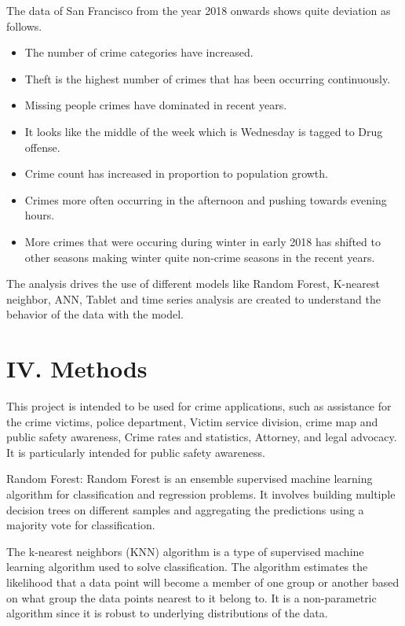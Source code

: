\documentclass[conference,final,]{IEEEtran}
\providecommand{\tightlist}{%
  \setlength{\itemsep}{0pt}\setlength{\parskip}{0pt}}
\begin{document}
The data of San Francisco from the year 2018 onwards shows quite
deviation as follows.

\begin{itemize}
\tightlist
\item
  The number of crime categories have increased.
\item
  Theft is the highest number of crimes that has been occurring
  continuously.
\item
  Missing people crimes have dominated in recent years.
\item
  It looks like the middle of the week which is Wednesday is tagged to
  Drug offense.
\item
  Crime count has increased in proportion to population growth.
\item
  Crimes more often occurring in the afternoon and pushing towards
  evening hours.
\item
  More crimes that were occuring during winter in early 2018 has shifted
  to other seasons making winter quite non-crime seasons in the recent
  years.
\end{itemize}

The analysis drives the use of different models like Random Forest,
K-nearest neighbor, ANN, Tablet and time series analysis are created to
understand the behavior of the data with the model.

\section{IV. Methods}\label{iv.-methods}

This project is intended to be used for crime applications, such as
assistance for the crime victims, police department, Victim service
division, crime map and public safety awareness, Crime rates and
statistics, Attorney, and legal advocacy. It is particularly intended
for public safety awareness.

Random Forest: Random Forest is an ensemble supervised machine learning
algorithm for classification and regression problems. It involves
building multiple decision trees on different samples and aggregating
the predictions using a majority vote for classification.

The k-nearest neighbors (KNN) algorithm is a type of supervised machine
learning algorithm used to solve classification. The algorithm estimates
the likelihood that a data point will become a member of one group or
another based on what group the data points nearest to it belong to. It
is a non-parametric algorithm since it is robust to underlying
distributions of the data.
\end{document}
